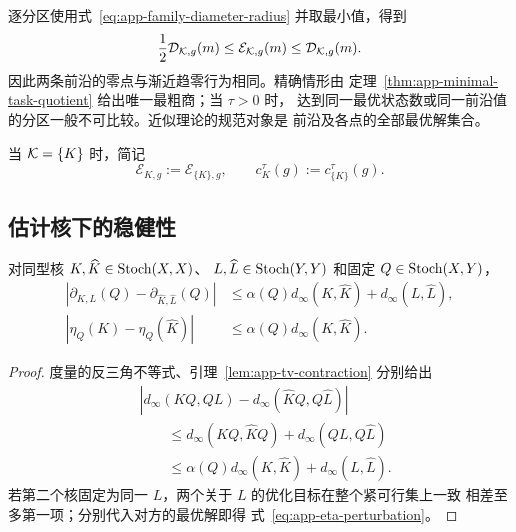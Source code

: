 逐分区使用式~\eqref{eq:app-family-diameter-radius} 并取最小值，得到
\begin{equation}
 \frac12\mathcal D_{\mathcal K,g}(m)
 \le\mathcal E_{\mathcal K,g}(m)
 \le\mathcal D_{\mathcal K,g}(m).
 \label{eq:app-frontier-radius-diameter}
\end{equation}
因此两条前沿的零点与渐近趋零行为相同。精确情形由
定理~\ref{thm:app-minimal-task-quotient} 给出唯一最粗商；当 $\tau>0$ 时，
达到同一最优状态数或同一前沿值的分区一般不可比较。近似理论的规范对象是
前沿及各点的全部最优解集合。

当 $\mathcal K=\{K\}$ 时，简记
\[
 \mathcal E_{K,g}:=\mathcal E_{\{K\},g},
 \qquad
 c_K^\tau(g):=c_{\{K\}}^\tau(g).
\]

\subsection{估计核下的稳健性}

\begin{proposition}[固定通道的模型误差转移]
\label{prop:app-model-perturbation}
对同型核 $K,\widehat K\in\operatorname{Stoch}(X,X)$、
$L,\widehat L\in\operatorname{Stoch}(Y,Y)$ 和固定 $Q\in\operatorname{Stoch}(X,Y)$，
\begin{align}
 \left|\partial_{K,L}(Q)-
 \partial_{\widehat K,\widehat L}(Q)\right|
 &\le \alpha(Q)d_\infty(K,\widehat K)
       +d_\infty(L,\widehat L),
 \label{eq:app-defect-perturbation}\\
 |\eta_Q(K)-\eta_Q(\widehat K)|
 &\le \alpha(Q)d_\infty(K,\widehat K).
 \label{eq:app-eta-perturbation}
\end{align}
\end{proposition}

\begin{proof}
度量的反三角不等式、引理~\ref{lem:app-tv-contraction} 分别给出
\begin{align*}
 &\left|d_\infty(KQ,QL)-d_\infty(\widehat KQ,Q\widehat L)\right|\\
 &\qquad\le d_\infty(KQ,\widehat KQ)+d_\infty(QL,Q\widehat L)\\
 &\qquad\le \alpha(Q)d_\infty(K,\widehat K)+d_\infty(L,\widehat L).
\end{align*}
若第二个核固定为同一 $L$，两个关于 $L$ 的优化目标在整个紧可行集上一致
相差至多第一项；分别代入对方的最优解即得
式~\eqref{eq:app-eta-perturbation}。
\end{proof}

